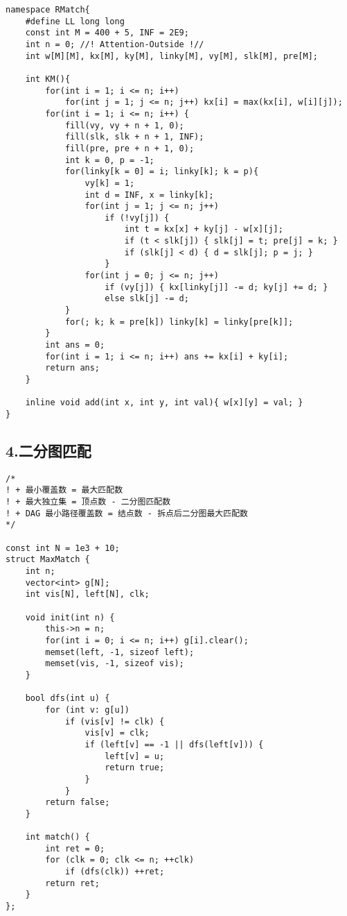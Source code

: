 \documentclass[]{article}
\begin{document}
\begin{verbatim}
namespace RMatch{
    #define LL long long
    const int M = 400 + 5, INF = 2E9;
    int n = 0; //! Attention-Outside !//
    int w[M][M], kx[M], ky[M], linky[M], vy[M], slk[M], pre[M];

    int KM(){
        for(int i = 1; i <= n; i++)
            for(int j = 1; j <= n; j++) kx[i] = max(kx[i], w[i][j]);
        for(int i = 1; i <= n; i++) {
            fill(vy, vy + n + 1, 0);
            fill(slk, slk + n + 1, INF);
            fill(pre, pre + n + 1, 0);
            int k = 0, p = -1;
            for(linky[k = 0] = i; linky[k]; k = p){
                vy[k] = 1;
                int d = INF, x = linky[k];
                for(int j = 1; j <= n; j++)
                    if (!vy[j]) {
                        int t = kx[x] + ky[j] - w[x][j];
                        if (t < slk[j]) { slk[j] = t; pre[j] = k; }
                        if (slk[j] < d) { d = slk[j]; p = j; }
                    }
                for(int j = 0; j <= n; j++)
                    if (vy[j]) { kx[linky[j]] -= d; ky[j] += d; }
                    else slk[j] -= d;
            }
            for(; k; k = pre[k]) linky[k] = linky[pre[k]];
        }
        int ans = 0;
        for(int i = 1; i <= n; i++) ans += kx[i] + ky[i];
        return ans;
    }

    inline void add(int x, int y, int val){ w[x][y] = val; }
}
\end{verbatim}

\hypertarget{ux4e8cux5206ux56feux5339ux914d}{%
\subsection{4.二分图匹配}\label{ux4e8cux5206ux56feux5339ux914d}}

\begin{verbatim}
/*
! + 最小覆盖数 = 最大匹配数
! + 最大独立集 = 顶点数 - 二分图匹配数
! + DAG 最小路径覆盖数 = 结点数 - 拆点后二分图最大匹配数
*/

const int N = 1e3 + 10;
struct MaxMatch {   
    int n;
    vector<int> g[N];
    int vis[N], left[N], clk;

    void init(int n) {
        this->n = n;
        for(int i = 0; i <= n; i++) g[i].clear();
        memset(left, -1, sizeof left);
        memset(vis, -1, sizeof vis);
    }

    bool dfs(int u) {
        for (int v: g[u])
            if (vis[v] != clk) {
                vis[v] = clk;
                if (left[v] == -1 || dfs(left[v])) {
                    left[v] = u;
                    return true;
                }
            }
        return false;
    }

    int match() {
        int ret = 0;
        for (clk = 0; clk <= n; ++clk)
            if (dfs(clk)) ++ret;
        return ret;
    }
};
\end{verbatim}
\end{document}

